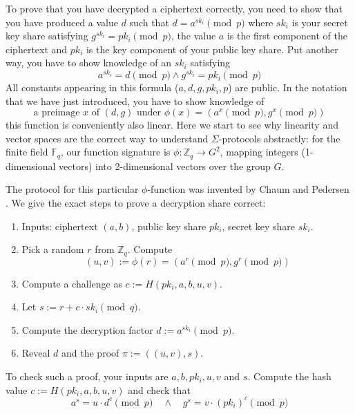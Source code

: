 \documentclass[envcountsame]{llncs}
\begin{document}
To prove that you have decrypted a ciphertext correctly, you need to show that
you have produced a value $d$ such that $d = a^{sk_i} \pmod{p}$ where $sk_i$ is
your secret key share satisfying $g^{sk_i} = pk_i \pmod{p}$, the value $a$ is
the first component of the ciphertext and $pk_i$ is the key component of your
public key share. Put another way, you have to show knowledge of an $sk_i$
satisfying
\[
a^{sk_i} = d \pmod{p} \wedge g^{sk_i} = pk_i \pmod{p}
\]
All constants appearing in this formula ($a, d, g, pk_i, p$) are public.
In the notation that we have just introduced, you have to show knowledge of
\[
\textrm{a preimage } x \textrm{ of } (d, g) \textrm { under } \phi(x) =
( a^x \pmod{p}, g^x \pmod{p})
\]
this function is conveniently also linear. Here we start to see why linearity
and vector spaces are the correct way to understand $\Sigma$-protocols
abstractly: for the finite field $\mathbb F_q$, our function signature is
$\phi: \mathbb Z_q \to G^2$, mapping integers (1-dimensional vectors) into
2-dimensional vectors over the group $G$.

The protocol for this particular $\phi$-function was invented by Chaum and
Pedersen \cite{CP92}. We give the exact steps to prove a decryption share
correct:
\begin{enumerate}
\item Inputs: ciphertext $(a, b)$, public key share $pk_i$, secret key share
$sk_i$.
\item Pick a random $r$ from $\mathbb Z_q$. Compute
\[
(u, v) := \phi(r) = (a^r \pmod{p}, g^r \pmod{p})
\]
\item Compute a challenge as $c := H(pk_i, a, b, u, v)$.
\item Let $s := r + c \cdot sk_i \pmod{q}$.
\item Compute the decryption factor $d := a^{sk_i} \pmod{p}$.
\item Reveal $d$ and the proof $\pi := ((u, v), s)$.
\end{enumerate}
To check such a proof, your inputs are $a, b, pk_i, u, v$ and $s$.
Compute the hash value $c := H(pk_i, a, b, u, v)$ and check that
\[
a^s = u \cdot d^c \pmod{p} \quad \wedge \quad g^s = v \cdot (pk_i)^c \pmod{p}
\]
\end{document}
